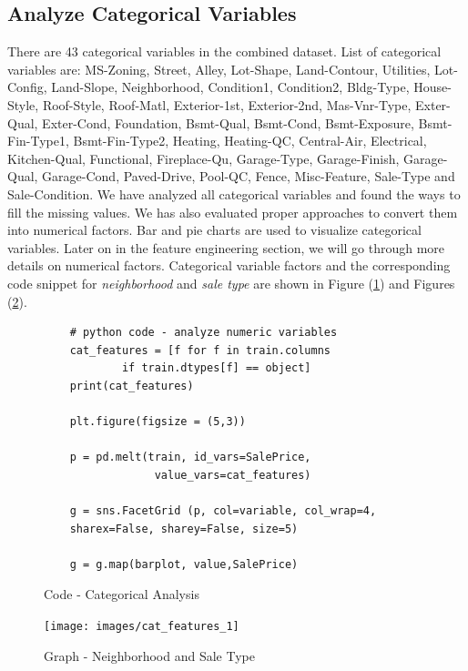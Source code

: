 \documentclass[sigconf]{acmart}
\begin{document}
	\subsection{Analyze Categorical Variables}
	There are 43 categorical variables in the combined dataset. List of categorical variables are: MS-Zoning, Street, Alley, Lot-Shape, Land-Contour, Utilities, Lot-Config, Land-Slope, Neighborhood, Condition1, Condition2, Bldg-Type, House-Style, Roof-Style, Roof-Matl, Exterior-1st, Exterior-2nd, Mas-Vnr-Type, Exter-Qual, Exter-Cond, Foundation, Bsmt-Qual, Bsmt-Cond, Bsmt-Exposure, Bsmt-Fin-Type1, Bsmt-Fin-Type2, Heating, Heating-QC, Central-Air, Electrical, Kitchen-Qual, Functional, Fireplace-Qu, Garage-Type, Garage-Finish, Garage-Qual, Garage-Cond, Paved-Drive, Pool-QC, Fence, Misc-Feature, Sale-Type and Sale-Condition. We have analyzed all categorical variables and found the ways to fill the missing values. We has also evaluated proper approaches to convert them into numerical factors. Bar and pie charts are used to visualize categorical variables. Later on in the feature engineering section, we will go through more details on numerical factors. Categorical variable factors and the corresponding code snippet for {\em neighborhood} and {\em sale type} are shown in Figure (\ref{c:analyze-cat}) and Figures (\ref{fig:cat_features_1}).
	
	\begin{figure}[htb]
	\begin{verbatim}	
	# python code - analyze numeric variables
	cat_features = [f for f in train.columns 
			if train.dtypes[f] == object]
	print(cat_features)
	
	plt.figure(figsize = (5,3))
	
	p = pd.melt(train, id_vars=SalePrice,
	             value_vars=cat_features)
	             
	g = sns.FacetGrid (p, col=variable, col_wrap=4, 
	sharex=False, sharey=False, size=5)
	
	g = g.map(barplot, value,SalePrice)				
	\end{verbatim}
	\caption{Code - Categorical Analysis} \label{c:analyze-cat} 
	\end{figure}

\begin{figure}[htb]
	\centering
	\texttt{[image: images/cat\_features\_1]}	
	\caption{Graph - Neighborhood and Sale Type} \label{fig:cat_features_1} 
\end{figure}
	
\end{document}
